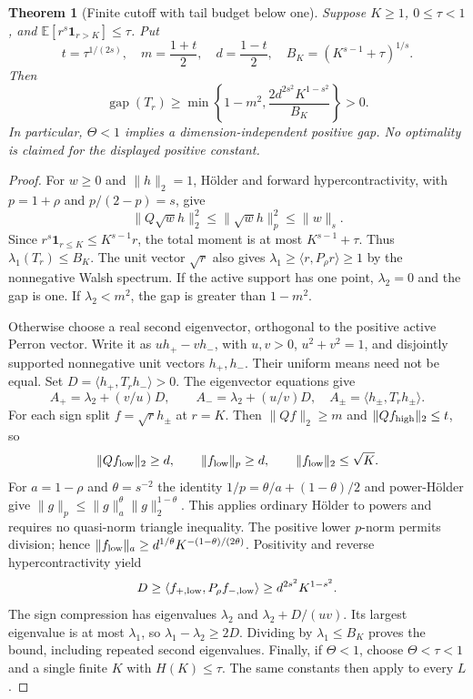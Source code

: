 \documentclass[11pt]{article}
\newtheorem{theorem}{Theorem}
\newcommand{\gap}{\operatorname{gap}}
\begin{document}
\begin{theorem}[Finite cutoff with tail budget below one]\label{thm:critical-tail}
Suppose $K\ge1$, $0\le\tau<1$, and
$\mathbb E[r^s\mathbf1_{r>K}]\le\tau$. Put
\[
 t=\tau^{1/(2s)},\quad m=\frac{1+t}{2},\quad d=\frac{1-t}{2},\quad
 B_K=(K^{s-1}+\tau)^{1/s}.
\]
Then
\[
 \gap(T_r)\ge
 \min\left\{1-m^2,\frac{2d^{2s^2}K^{1-s^2}}{B_K}\right\}>0.
\]
In particular, $\Theta<1$ implies a dimension-independent positive gap.
No optimality is claimed for the displayed positive constant.
\end{theorem}
\begin{proof}
For $w\ge0$ and $\|h\|_2=1$, H\"older and forward hypercontractivity,
with $p=1+\rho$ and $p/(2-p)=s$, give
\[
 \|Q\sqrt w h\|_2^2\le\|\sqrt w h\|_p^2\le\|w\|_s.
\]
Since $r^s\mathbf1_{r\le K}\le K^{s-1}r$, the total moment is at most
$K^{s-1}+\tau$. Thus $\lambda_1(T_r)\le B_K$. The unit vector
$\sqrt r$ also gives $\lambda_1\ge\langle r,P_\rho r\rangle\ge1$
by the nonnegative Walsh spectrum.
If the active support has one point, $\lambda_2=0$ and the gap is one.
If $\lambda_2<m^2$, the gap is greater than $1-m^2$.

Otherwise choose a real second eigenvector, orthogonal to the positive
active Perron vector. Write it as $u h_+-v h_-$, with $u,v>0$,
$u^2+v^2=1$, and disjointly supported nonnegative unit vectors
$h_+,h_-$. Their uniform means need not be equal. Set
$D=\langle h_+,T_rh_-\rangle>0$. The eigenvector equations give
\[
 A_+=\lambda_2+(v/u)D,\qquad A_-=\lambda_2+(u/v)D,
 \quad A_\pm=\langle h_\pm,T_rh_\pm\rangle.
\]
For each sign split $f=\sqrt r h_\pm$ at $r=K$. Then
$\|Qf\|_2\ge m$ and $\|Qf_{\rm high}\|_2\le t$, so
\[
 \|Qf_{\rm low}\|_2\ge d,\qquad
 \|f_{\rm low}\|_p\ge d,\qquad
 \|f_{\rm low}\|_2\le\sqrt K.
\]
For $a=1-\rho$ and $\theta=s^{-2}$ the identity
$1/p=\theta/a+(1-\theta)/2$ and power-H\"older give
$\|g\|_p\le\|g\|_a^\theta\|g\|_2^{1-\theta}$.
This applies ordinary H\"older to powers and requires no quasi-norm
triangle inequality. The positive lower $p$-norm permits division;
hence $\|f_{\rm low}\|_a\ge d^{1/\theta}K^{-(1-\theta)/(2\theta)}$.
Positivity and reverse hypercontractivity yield
\[
 D\ge\langle f_{+,\rm low},P_\rho f_{-,\rm low}\rangle
 \ge d^{2s^2}K^{1-s^2}.
\]
The sign compression has eigenvalues $\lambda_2$ and
$\lambda_2+D/(uv)$. Its largest eigenvalue is at most $\lambda_1$,
so $\lambda_1-\lambda_2\ge2D$. Dividing by $\lambda_1\le B_K$
proves the bound, including repeated second eigenvalues.
Finally, if $\Theta<1$, choose $\Theta<\tau<1$ and a single finite
$K$ with $H(K)\le\tau$. The same constants then apply to every $L$.
\end{proof}
\end{document}
